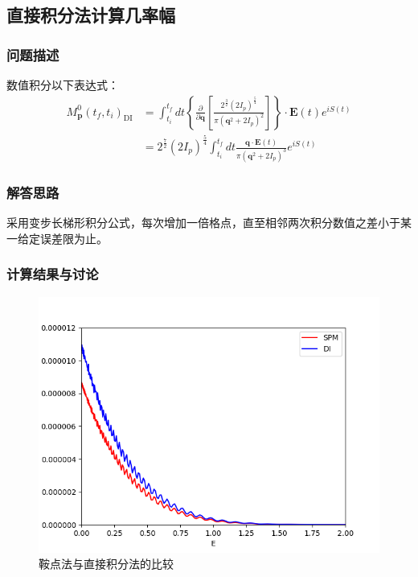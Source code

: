 \documentclass{ctexart}
\begin{document}
\subsection{直接积分法计算几率幅}
\subsubsection{问题描述}
数值积分以下表达式：
$$
\begin{aligned} M_{\mathbf{p}}^{0}\left(t_{f}, t_{i}\right)_{\mathrm{D I}} &=\int_{t_{i}}^{t_{f}} d t\left\{\frac{\partial}{\partial \mathbf{q}}\left[\frac{2^{\frac{3}{2}}\left(2 I_{p}\right)^{\frac{5}{4}}}{\pi\left(\mathbf{q}^{2}+2 I_{p}\right)^{2}}\right]\right\} \cdot \mathbf{E}(t) e^{i S(t)} \\ &=2^{\frac{7}{2}}\left(2 I_{p}\right)^{\frac{5}{4}} \int_{t_{i}}^{t_{f}} d t \frac{\mathbf{q} \cdot \mathbf{E}(t)}{\pi\left(\mathbf{q}^{2}+2 I_{p}\right)^{3}} e^{i S(t)} \end{aligned}
$$
\subsubsection{解答思路}
采用变步长梯形积分公式，每次增加一倍格点，直至相邻两次积分数值之差小于某一给定误差限为止。
\subsubsection{计算结果与讨论}
\begin{figure}[h]
\centering
\includegraphics[scale=0.6]{spm_di.png}
\caption{鞍点法与直接积分法的比较}
\end{figure}
\end{document}
